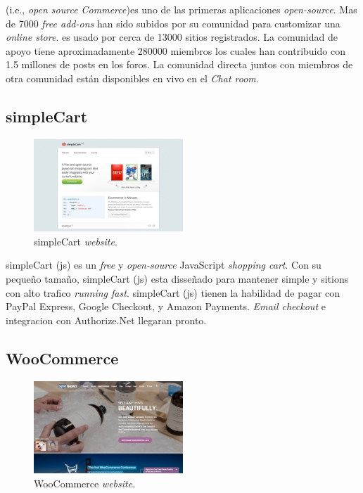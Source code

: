 \nameOsCommerce (i.e., \textit{open source Commerce})es uno de las primeras aplicaciones \ecommerce \textit{open-source}. Mas de 7000 \textit{free add-ons} han sido subidos por su comunidad para customizar una  \textit{online store}. \nameOsCommerce es usado por cerca de 13000 sitios registrados. La comunidad de apoyo tiene aproximadamente 280000 miembros los cuales han contribuido con 1.5 millones de posts en los foros. La comunidad directa juntos con miembros de otra comunidad están disponibles en vivo en el \textit{Chat room}.

\newcommand{\nameSimpleCart}{simpleCart }
\subsection{\nameSimpleCart}

\begin{figure}[h!]
	\centering
	\includegraphics[width=0.5\textwidth]{figuras/cap1/simpleCartWebsite.jpg}
	\caption{\nameSimpleCart \textit{website}\cite{online_simpleCart}.}
\end{figure}

\nameSimpleCart(js) es un \textit{free} y \textit{open-source} JavaScript \textit{shopping cart}. Con su pequeño tamaño, \nameSimpleCart(js) esta disseñado para mantener simple  y sitions con alto trafico \textit{running fast}. \nameSimpleCart(js) tienen la habilidad de pagar con PayPal Express, Google Checkout, y Amazon Payments. \textit{Email checkout} e integracion con  Authorize.Net llegaran pronto.

\newcommand{\nameWooCommerce}{WooCommerce }
\subsection{\nameWooCommerce}

\begin{figure}[h!]
	\centering
	\includegraphics[width=0.5\textwidth]{figuras/cap1/WooCommerceWebsite.jpg}
	\caption{\nameWooCommerce \textit{website}\cite{online_WooCommerce}.}
\end{figure}

